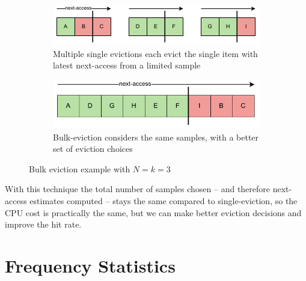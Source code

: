 \begin{figure}
    \centering
    \begin{subfigure}{\columnwidth}
        \centering
        \includegraphics[width=\columnwidth]{figures/Diagrams/diagrams-multi-eviction-a.pdf}
        \caption{Multiple single evictions each evict the single item with latest next-access from a limited sample}
    \end{subfigure}
    \vspace{5pt}
    \begin{subfigure}{\columnwidth}
        \centering
        \includegraphics[width=0.8181818\columnwidth]{figures/Diagrams/diagrams-multi-eviction-b.pdf}
        \caption{Bulk-eviction considers the same samples, with a better set of eviction choices}
    \end{subfigure}
    
    \caption{Bulk eviction example with $N=k=3$}
    \label{fig:multi-eviction}
\end{figure}

With this technique the total number of samples chosen -- and therefore next-access estimates computed -- stays the same compared to single-eviction, so the CPU cost is practically the same, but we can make better eviction decisions and improve the hit rate.





\section{\label{sec:frequency-stats}Frequency Statistics}


